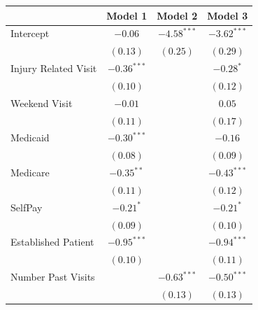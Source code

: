 \documentclass[12pt,twoside]{reedthesis}
\begin{document}
  \begin{table}
  \begin{center}
  \begin{small}
  \begin{tabular}{l c c c }
  \hline
   & Model 1 & Model 2 & Model 3 \\
  \hline
  Intercept                     & $-0.06$                & $\mathbf{-4.58}^{***}$ & $\mathbf{-3.62}^{***}$ \\
                                & $(0.13)$               & $(0.25)$               & $(0.29)$               \\
  Injury Related Visit          & $\mathbf{-0.36}^{***}$ &                        & $-0.28^{*}$            \\
                                & $(0.10)$               &                        & $(0.12)$               \\
  Weekend Visit                 & $-0.01$                &                        & $0.05$                 \\
                                & $(0.11)$               &                        & $(0.17)$               \\
  Medicaid                      & $\mathbf{-0.30}^{***}$ &                        & $-0.16$                \\
                                & $(0.08)$               &                        & $(0.09)$               \\
  Medicare                      & $-0.35^{**}$           &                        & $\mathbf{-0.43}^{***}$ \\
                                & $(0.11)$               &                        & $(0.12)$               \\
  SelfPay                       & $-0.21^{*}$            &                        & $-0.21^{*}$            \\
                                & $(0.09)$               &                        & $(0.10)$               \\
  Established Patient           & $\mathbf{-0.95}^{***}$ &                        & $\mathbf{-0.94}^{***}$ \\
                                & $(0.10)$               &                        & $(0.11)$               \\
  Number Past Visits            &                        & $\mathbf{-0.63}^{***}$ & $\mathbf{-0.50}^{***}$ \\
                                &                        & $(0.13)$               & $(0.13)$               \\

\end{tabular}
\end{small}
\end{center}
\end{table}
\end{document}
